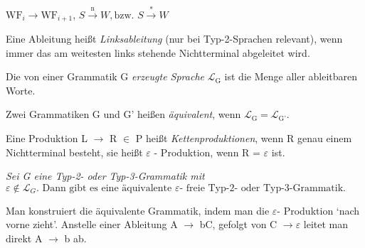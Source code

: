 \documentclass[11pt, a4paper]{article}
\newcommand{\Lagr}{\mathcal{L}}
\begin{document}
\begin{flushleft}
\begin{tcolorbox}[title = Definition 1.8]
\begin{itemize}[-]
\begin{flushleft}
                      \(\text{WF}_i \rightarrow \text{WF}_{i+1}\), \(S \xrightarrow{\text{n}} W, \text{bzw. } S \xrightarrow{\text{*}} W\)
                  \end{flushleft}
        \end{itemize}
    \end{tcolorbox}

    \begin{tcolorbox}[title = Definition 1.9]
        Eine Ableitung heißt \emph{Linksableitung} (nur bei Typ-2-Sprachen relevant), wenn immer das am weitesten links stehende Nichtterminal abgeleitet wird.
    \end{tcolorbox}

    \begin{tcolorbox}[title = Definition 1.10]
        Die von einer Grammatik G \emph{erzeugte Sprache} \(\Lagr_{\text{G}}\) ist die Menge aller ableitbaren Worte.
    \end{tcolorbox}

    \begin{tcolorbox}[title = Definition 1.11]
        Zwei Grammatiken G und G' heißen \emph{äquivalent}, wenn \(\Lagr_{\text{G}} = \Lagr_{\text{G'}}\).
    \end{tcolorbox}

    \begin{tcolorbox}[title = Definition 1.12]
        Eine Produktion L \(\rightarrow\) R \(\in\) P heißt \emph{Kettenproduktionen}, wenn R genau einem Nichtterminal besteht, sie heißt \(\varepsilon\) - Produktion, wenn R = \(\varepsilon\) ist.
    \end{tcolorbox}

    \begin{tcolorbox}[title = Satz 1.1]
        \begin{flushleft}
            \textit{Sei G eine Typ-2- oder Typ-3-Grammatik mit \(\varepsilon \notin \Lagr_G \text{. Dann gibt es eine äquivalente } \varepsilon \text{- freie Typ-2- oder Typ-3-Grammatik.}\)}
        \end{flushleft}
    \end{tcolorbox}

    \begin{tcolorbox}[title = Satz 1.1 Beweis, colbacktitle = white, coltitle = black, colframe = black, colback = white, fonttitle = \bfseries]

        Man konstruiert die äquivalente Grammatik, indem man die \(\varepsilon\)- Produktion `nach vorne zieht'. Anstelle einer Ableitung A \(\rightarrow\) bC, gefolgt von C \(\rightarrow \varepsilon\) leitet man direkt A \(\rightarrow\) b ab.


\end{tcolorbox}
\end{flushleft}
\end{document}
